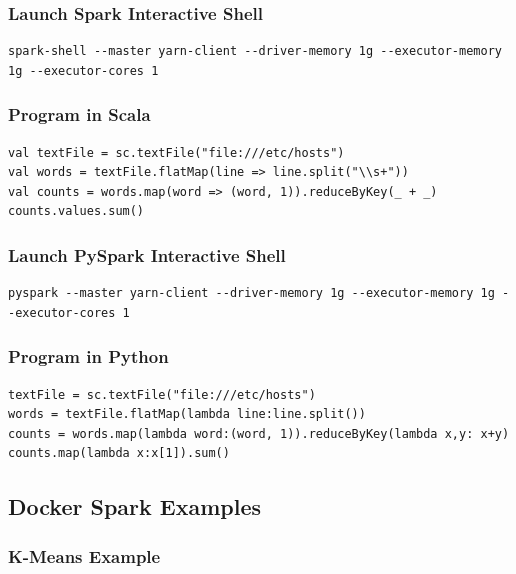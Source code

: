 \subsubsection{Launch Spark Interactive Shell}

\begin{lstlisting}
spark-shell --master yarn-client --driver-memory 1g --executor-memory 1g --executor-cores 1
\end{lstlisting}

\subsubsection{Program in Scala}

\begin{lstlisting}
val textFile = sc.textFile("file:///etc/hosts")
val words = textFile.flatMap(line => line.split("\\s+"))
val counts = words.map(word => (word, 1)).reduceByKey(_ + _)
counts.values.sum()
\end{lstlisting}

\subsubsection{Launch PySpark Interactive Shell}

\begin{lstlisting}
pyspark --master yarn-client --driver-memory 1g --executor-memory 1g --executor-cores 1
\end{lstlisting}

\subsubsection{Program in Python}

\begin{lstlisting}
textFile = sc.textFile("file:///etc/hosts")
words = textFile.flatMap(lambda line:line.split())
counts = words.map(lambda word:(word, 1)).reduceByKey(lambda x,y: x+y)
counts.map(lambda x:x[1]).sum()
\end{lstlisting}

\subsection{Docker Spark Examples}

\subsubsection{K-Means Example}

